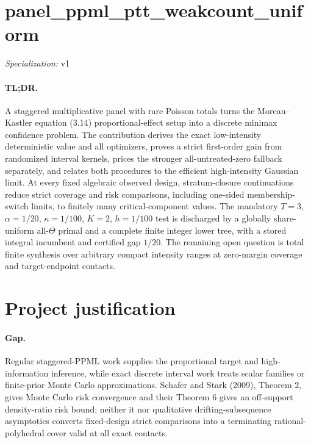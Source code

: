 \documentclass{article}
\begin{document}
\sloppy

\section*{panel\_\allowbreak{}ppml\_\allowbreak{}ptt\_\allowbreak{}weakcount\_\allowbreak{}uniform}

\noindent\textit{Specialization:} v1\par

\paragraph{TL;DR.} A staggered multiplicative panel with rare Poisson totals turns the Moreau--Kastler equation (3.14) proportional-effect setup into a discrete minimax confidence problem. The contribution derives the exact low-intensity deterministic value and all optimizers, proves a strict first-order gain from randomized interval kernels, prices the stronger all-untreated-zero fallback separately, and relates both procedures to the efficient high-intensity Gaussian limit. At every fixed algebraic observed design, stratum-closure continuations reduce strict coverage and risk comparisons, including one-sided membership-switch limits, to finitely many critical-component values. The mandatory \(T=3\), \(\alpha=1/20\), \(\kappa=1/100\), \(K=2\), \(h=1/100\) test is discharged by a globally share-uniform all-\(\Theta\) primal and a complete finite integer lower tree, with a stored integral incumbent and certified gap \(1/20\). The remaining open question is total finite synthesis over arbitrary compact intensity ranges at zero-margin coverage and target-endpoint contacts.

\section{Project justification}

\paragraph{Gap.} Regular staggered-PPML work supplies the proportional target and high-information inference, while exact discrete interval work treats scalar families or finite-prior Monte Carlo approximations. Schafer and Stark (2009), Theorem 2, gives Monte Carlo risk convergence and their Theorem 6 gives an off-support density-ratio risk bound; neither it nor qualitative drifting-subsequence asymptotics converts fixed-design strict comparisons into a terminating rational-polyhedral cover valid at all exact contacts.
\end{document}
